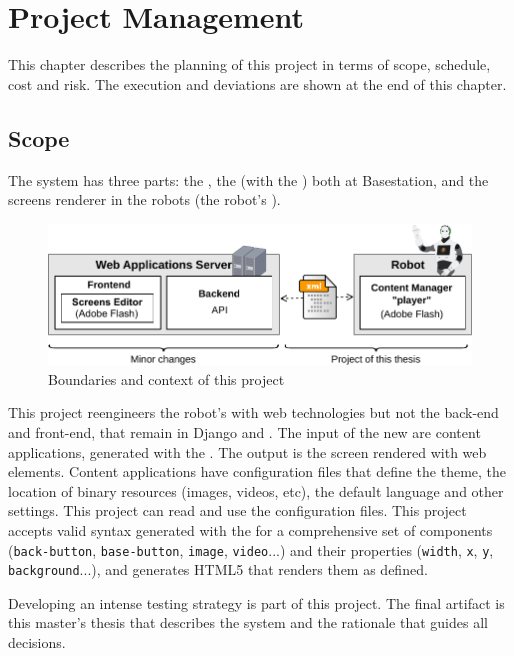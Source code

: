 \chapter{Project Management}
This chapter describes the planning of this project in terms of scope, schedule, cost and risk.
The execution and deviations are shown at the end of this chapter.

\section{Scope}
\label{sec:scope}
The system has three parts: the \flangobe, the \flangofe (with the \se) both at Basestation, and the screens renderer in the robots (the robot's \cm {}).

\begin{figure}[htb]
    \centering
    \includegraphics{figures/intro-system-overview.pdf}
    \caption{Boundaries and context of this project}
    \label{fig:system-overview}
\end{figure}

This project reengineers the robot's \cm with web technologies but not the back-end and front-end, that remain in Django and \flash.
The input of the new \cm are content applications, generated with the \se . The output is the screen rendered with web elements.
Content applications have configuration files that define the theme, the location of binary resources (images, videos, etc), the default language and other settings. 
This project can read and use the configuration files.
This project accepts valid syntax generated with the \se for a comprehensive set of components (\texttt{back-button}, \texttt{base-button}, \texttt{image}, \texttt{video}...) and their properties (\texttt{width}, \texttt{x}, \texttt{y}, \texttt{background}...), and generates \ac{HTML5} that renders them as defined.

Developing an intense testing strategy is part of this project.
The final artifact is this master's thesis that describes the system and the rationale that guides all decisions.

